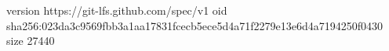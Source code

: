 version https://git-lfs.github.com/spec/v1
oid sha256:023da3c9569fbb3a1aa17831fcecb5ece5d4a71f2279e13e6d4a7194250f0430
size 27440
